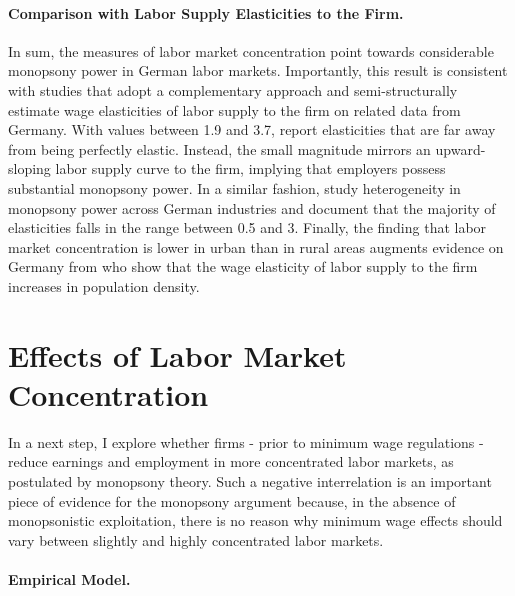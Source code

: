\documentclass[11pt,oneside,reqno,xcolor=dvipsnames]{article} %
\begin{document}
\paragraph{Comparison with Labor Supply Elasticities to the Firm.} In sum, the measures of labor market concentration point towards considerable monopsony power in German labor markets. Importantly, this result is consistent with studies that adopt a complementary approach and semi-structurally estimate wage elasticities of labor supply to the firm on related data from Germany. With values between 1.9 and 3.7, \citet{HirschEtAl2010} report elasticities that are far away from being perfectly elastic. Instead, the small magnitude mirrors an upward-sloping labor supply curve to the firm, implying that employers possess substantial monopsony power. In a similar fashion, \citet{BachmannFrings2017} study heterogeneity in monopsony power across German industries and document that the majority of elasticities falls in the range between 0.5 and 3. Finally, the finding that labor market concentration is lower in urban than in rural areas augments evidence on Germany from \citet{HirschEtAl2020} who show that the wage elasticity of labor supply to the firm increases in population density.







\section{Effects of Labor Market Concentration}
\label{sec:6}

In a next step, I explore whether firms - prior to minimum wage regulations - reduce earnings and employment in more concentrated labor markets, as postulated by monopsony theory. Such a negative interrelation is an important piece of evidence for the monopsony argument because, in the absence of monopsonistic exploitation, there is no reason why minimum wage effects should vary between slightly and highly concentrated labor markets.

\paragraph{Empirical Model.}
\end{document}
